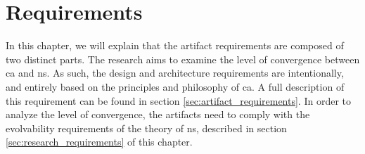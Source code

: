 \chapter{Requirements} \label{chap:requirements} 

In this chapter, we will explain that the artifact requirements are composed of two
distinct parts. The research aims to examine the level of convergence between \gls{ca} and
\gls{ns}. As such, the design and architecture requirements are intentionally, and entirely 
based on the principles and philosophy of \gls{ca}. A full description of this requirement
can be found in section \ref{sec:artifact_requirements}. In order to analyze the level of
convergence, the artifacts need to comply with the evolvability requirements of the theory
of \gls{ns}, described in section \ref{sec:research_requirements} of this chapter.


